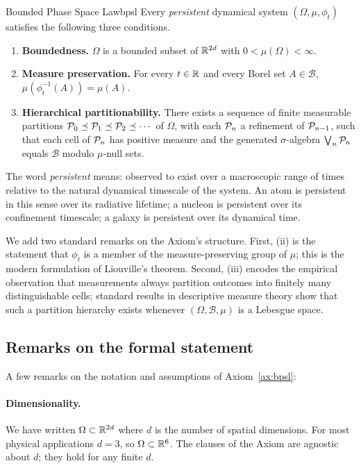 \begin{axiom}{Bounded Phase Space Law}{bpsl}
Every \emph{persistent} dynamical system $(\Omega,\mu,\phi_{t})$ satisfies the following three conditions.
\begin{enumerate}[label=(\roman*)]
  \item \textbf{Boundedness.} $\Omega$ is a bounded subset of $\mathbb{R}^{2d}$ with $0<\mu(\Omega)<\infty$.
  \item \textbf{Measure preservation.} For every $t\in\mathbb{R}$ and every Borel set $A\in\mathcal{B}$, $\mu(\phi_{t}^{-1}(A))=\mu(A)$.
  \item \textbf{Hierarchical partitionability.} There exists a sequence of finite measurable partitions $\mathcal{P}_{0}\preceq\mathcal{P}_{1}\preceq\mathcal{P}_{2}\preceq\cdots$ of $\Omega$, with each $\mathcal{P}_{n}$ a refinement of $\mathcal{P}_{n-1}$, such that each cell of $\mathcal{P}_{n}$ has positive measure and the generated $\sigma$-algebra $\bigvee_{n}\mathcal{P}_{n}$ equals $\mathcal{B}$ modulo $\mu$-null sets.
\end{enumerate}
\end{axiom}

The word \emph{persistent} means: observed to exist over a macroscopic range of times relative to the natural dynamical timescale of the system. An atom is persistent in this sense over its radiative lifetime; a nucleon is persistent over its confinement timescale; a galaxy is persistent over its dynamical time.

We add two standard remarks on the Axiom's structure. First, (ii) is the statement that $\phi_{t}$ is a member of the measure-preserving group of $\mu$; this is the modern formulation of Liouville's theorem. Second, (iii) encodes the empirical observation that measurements always partition outcomes into finitely many distinguishable cells; standard results in descriptive measure theory \citep{halmos1950,rudin1987} show that such a partition hierarchy exists whenever $(\Omega,\mathcal{B},\mu)$ is a Lebesgue space.

\subsection{Remarks on the formal statement}

A few remarks on the notation and assumptions of Axiom~\ref{ax:bpsl}:

\paragraph{Dimensionality.} We have written $\Omega\subset\mathbb{R}^{2d}$ where $d$ is the number of spatial dimensions. For most physical applications $d=3$, so $\Omega\subset\mathbb{R}^{6}$. The clauses of the Axiom are agnostic about $d$; they hold for any finite $d$.

